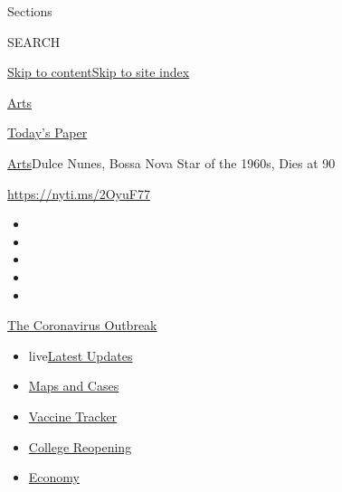 Sections

SEARCH

\protect\hyperlink{site-content}{Skip to
content}\protect\hyperlink{site-index}{Skip to site index}

\href{https://www.nytimes3xbfgragh.onion/section/arts}{Arts}

\href{https://myaccount.nytimes3xbfgragh.onion/auth/login?response_type=cookie\&client_id=vi}{}

\href{https://www.nytimes3xbfgragh.onion/section/todayspaper}{Today's
Paper}

\href{/section/arts}{Arts}\textbar{}Dulce Nunes, Bossa Nova Star of the
1960s, Dies at 90

\url{https://nyti.ms/2OyuF77}

\begin{itemize}
\item
\item
\item
\item
\item
\end{itemize}

\href{https://www.nytimes3xbfgragh.onion/news-event/coronavirus?action=click\&pgtype=Article\&state=default\&region=TOP_BANNER\&context=storylines_menu}{The
Coronavirus Outbreak}

\begin{itemize}
\tightlist
\item
  live\href{https://www.nytimes3xbfgragh.onion/2020/08/04/world/coronavirus-covid-19.html?action=click\&pgtype=Article\&state=default\&region=TOP_BANNER\&context=storylines_menu}{Latest
  Updates}
\item
  \href{https://www.nytimes3xbfgragh.onion/interactive/2020/us/coronavirus-us-cases.html?action=click\&pgtype=Article\&state=default\&region=TOP_BANNER\&context=storylines_menu}{Maps
  and Cases}
\item
  \href{https://www.nytimes3xbfgragh.onion/interactive/2020/science/coronavirus-vaccine-tracker.html?action=click\&pgtype=Article\&state=default\&region=TOP_BANNER\&context=storylines_menu}{Vaccine
  Tracker}
\item
  \href{https://www.nytimes3xbfgragh.onion/2020/08/02/us/covid-college-reopening.html?action=click\&pgtype=Article\&state=default\&region=TOP_BANNER\&context=storylines_menu}{College
  Reopening}
\item
  \href{https://www.nytimes3xbfgragh.onion/live/2020/08/03/business/stock-market-today-coronavirus?action=click\&pgtype=Article\&state=default\&region=TOP_BANNER\&context=storylines_menu}{Economy}
\end{itemize}

